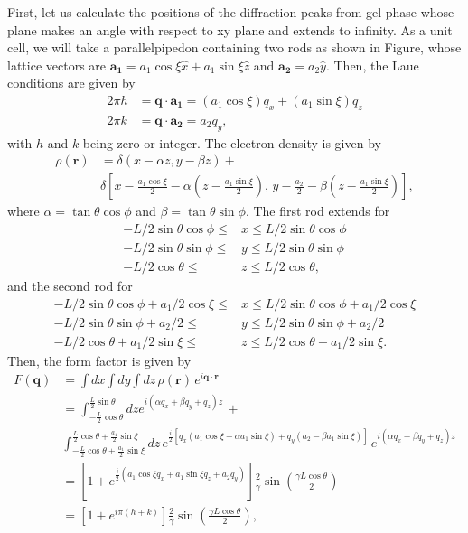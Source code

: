 \documentclass[letterpaper,12pt]{article}
\begin{document}
First, let us calculate the positions of the diffraction  peaks from gel phase whose plane makes an angle with respect to xy plane and extends to infinity. As a unit cell, we will take a parallelpipedon containing two rods as shown in Figure, whose lattice vectors are $\mathbf{a_1}=a_1\cos\xi\hat{x}+a_1\sin\xi\hat{z}$ and $\mathbf{a_2}=a_2\hat{y}$. Then, the Laue conditions are given by
\begin{align}
	2\pi h &=\mathbf{q}\cdot\mathbf{a_1}=(a_1\cos\xi)q_x+(a_1\sin\xi)q_z \\
	2\pi k &=\mathbf{q}\cdot\mathbf{a_2}=a_2 q_y,
\end{align}
with $h$ and $k$ being zero or integer. The electron density is given by 
\begin{align}
	\rho(\mathbf{r})&=\delta(x-\alpha z, y-\beta z)+\\
	&\delta\left[x-\frac{a_1\cos\xi}{2}-\alpha\left(z-\frac{a_1\sin\xi}{2}\right),\, y-\frac{a_2}{2}-\beta\left(z-\frac{a_1\sin\xi}{2}\right)\right],
\end{align}
where $\alpha=\tan\theta\cos\phi$ and $\beta=\tan\theta\sin\phi$. The first rod extends for
\begin{align}%
	-L/2\sin\theta\cos\phi\leq &x\leq L/2\sin\theta\cos\phi\\ 
	-L/2\sin\theta\sin\phi\leq &y \leq L/2\sin\theta\sin\phi\\
	-L/2\cos\theta\leq &z \leq L/2\cos\theta,
\end{align}
and the second rod for
\begin{align}%
	-L/2\sin\theta\cos\phi+a_1/2\cos\xi\leq &x\leq L/2\sin\theta\cos\phi+a_1/2\cos\xi\\ 
	-L/2\sin\theta\sin\phi+a_2/2 \leq &y \leq L/2\sin\theta\sin\phi+a_2/2\\
	-L/2\cos\theta+a_1/2\sin\xi \leq &z \leq L/2\cos\theta+a_1/2\sin\xi.
\end{align}
Then, the form factor is given by
\begin{align}%
	F(\mathbf{q})&=\int dx\int dy\int dz\,\rho(\mathbf{r})\,e^{i\mathbf{q}\cdot\mathbf{r}}\\
	&=\int_{-\frac{L}{2}\cos\theta}^{\frac{L}{2}\sin\theta}dz e^{i(\alpha q_x+\beta q_y+q_z)z}\,+\nonumber\\
	&\int_{-\frac{L}{2}\cos\theta+\frac{a_1}{2}\sin\xi}^{\frac{L}{2}\cos\theta+\frac{a_1}{2}\sin\xi}dz\, e^{\frac{i}{2}\left[q_x\left(a_1\cos\xi-\alpha a_1\sin\xi\right)+q_y\left(a_2-\beta a_1\sin\xi\right)\right]}\,e^{i(\alpha q_x+\beta q_y+q_z)z}\nonumber\\
	&=\left[1+e^{\frac{i}{2}\left(a_1\cos\xi q_x+a_1\sin\xi q_z+a_2q_y\right)}\right]\frac{2}{\gamma}\sin\left(\frac{\gamma L\cos\theta}{2}\right)\nonumber\\
	&=\left[1+e^{i\pi(h+k)}\right]\frac{2}{\gamma}\sin\left(\frac{\gamma L\cos\theta}{2}\right)\label{eq:FormFactor},
\end{align}
\end{document}
